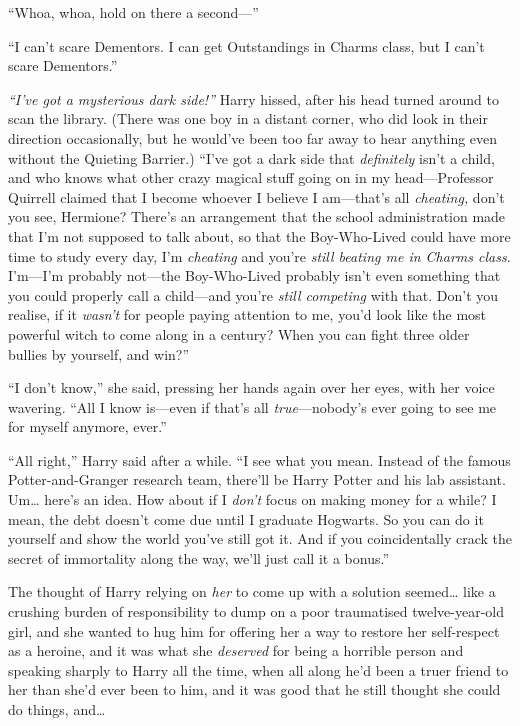 ``Whoa, whoa, hold on there a second---''

``I can't scare Dementors. I can get Outstandings in Charms class, but I
can't scare Dementors.''

\emph{``I've got a mysterious dark side!''} Harry hissed, after his head
turned around to scan the library. (There was one boy in a distant
corner, who did look in their direction occasionally, but he would've
been too far away to hear anything even without the Quieting Barrier.)
``I've got a dark side that \emph{definitely} isn't a child, and who
knows what other crazy magical stuff going on in my head---Professor
Quirrell claimed that I become whoever I believe I am---that's all
\emph{cheating,} don't you see, Hermione? There's an arrangement that
the school administration made that I'm not supposed to talk about, so
that the Boy-Who-Lived could have more time to study every day, I'm
\emph{cheating} and you're \emph{still beating me in Charms class.}
I'm---I'm probably not---the Boy-Who-Lived probably isn't even something
that you could properly call a child---and you're \emph{still competing}
with that. Don't you realise, if it \emph{wasn't} for people paying
attention to me, you'd look like the most powerful witch to come along
in a century? When you can fight three older bullies by yourself, and
win?''

``I don't know,'' she said, pressing her hands again over her eyes, with
her voice wavering. ``All I know is---even if that's all
\emph{true}---nobody's ever going to see me for myself anymore, ever.''

``All right,'' Harry said after a while. ``I see what you mean. Instead
of the famous Potter-and-Granger research team, there'll be Harry Potter
and his lab assistant. Um\ldots{} here's an idea. How about if I
\emph{don't} focus on making money for a while? I mean, the debt doesn't
come due until I graduate Hogwarts. So you can do it yourself and show
the world you've still got it. And if you coincidentally crack the
secret of immortality along the way, we'll just call it a bonus.''

The thought of Harry relying on \emph{her} to come up with a solution
seemed\ldots{} like a crushing burden of responsibility to dump on a
poor traumatised twelve-year-old girl, and she wanted to hug him for
offering her a way to restore her self-respect as a heroine, and it was
what she \emph{deserved} for being a horrible person and speaking
sharply to Harry all the time, when all along he'd been a truer friend
to her than she'd ever been to him, and it was good that he still
thought she could do things, and\ldots{}

